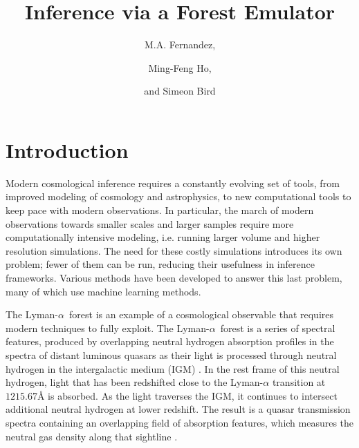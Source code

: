 \documentclass[a4paper,11pt]{article}
\title{\boldmath Inference via a \lya Forest Emulator}
\author{M.A. Fernandez,}\emailAdd{mfern027@ucr.edu}
\author{Ming-Feng Ho,}\emailAdd{mho026@ucr.edu}
\author{and Simeon Bird}\emailAdd{sbird@ucr.edu}
\affiliation{Department of Physics and Astronomy, University of California Riverside, 900 University Ave, Riverside, CA 92521}
\newcommand{\lya}{Lyman-$\alpha$\ }
\begin{document}
\maketitle
\flushbottom
%

\section{Introduction}\label{sec:intro}

Modern cosmological inference requires a constantly evolving set of tools, from improved modeling of cosmology and astrophysics, to new computational tools to keep pace with modern observations.
In particular, the march of modern observations towards smaller scales and larger samples require more computationally intensive modeling, i.e. running larger volume and higher resolution simulations.
The need for these costly simulations introduces its own problem; fewer of them can be run, reducing their usefulness in inference frameworks.
Various methods have been developed to answer this last problem, many of which use machine learning methods.

The \lya forest \citep{1965ApJ...142.1633G, 1998MNRAS.301..478T, 2000ApJ...543....1M, 2001ApJ...552...15H, 2002MNRAS.329..848V, 2006AJ....132..117F, 2006MNRAS.365..231V, 2006ApJS..163...80M} is an example of a cosmological observable that requires modern techniques to fully exploit.
The \lya forest is a series of spectral features, produced by overlapping neutral hydrogen absorption profiles in the spectra of distant luminous quasars as their light is processed through neutral hydrogen in the intergalactic medium (IGM) \citep{1965ApJ...142.1633G}.
In the rest frame of this neutral hydrogen, light that has been redshifted close to the Lyman-$\alpha$ transition at $1215.67${\AA} is absorbed.
As the light traverses the IGM, it continues to intersect additional neutral hydrogen at lower redshift.
The result is a quasar transmission spectra containing an overlapping field of absorption features, which measures the neutral gas density along that sightline \citep{1998ApJ...495...44C}.
\end{document}
